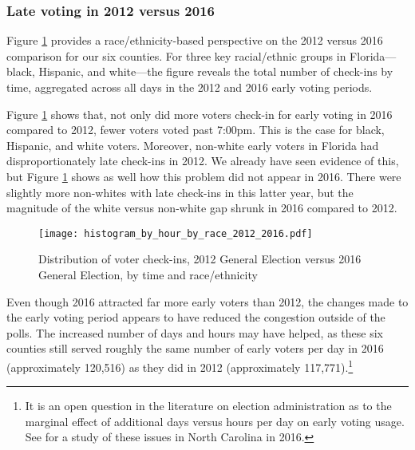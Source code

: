 \documentclass[12pt,titlepage]{article}
\begin{document}
% 

\subsubsection*{Late voting in 2012 versus 2016}

Figure \ref{fig:race2012and2016} provides a race/ethnicity-based
perspective on the 2012 versus 2016 comparison for our six counties.
For three key racial/ethnic groups in Florida---black, Hispanic, and
white---the figure reveals the total number of check-ins by time,
aggregated across all days in the 2012 and 2016 early voting periods.

Figure \ref{fig:race2012and2016} shows that, not only did more voters
check-in for early voting in 2016 compared to 2012, fewer voters voted
past 7:00pm.  This is the case for black, Hispanic, and white
voters. Moreover, non-white early voters in Florida had
disproportionately late check-ins in 2012.  We already have seen
evidence of this, but Figure \ref{fig:race2012and2016} shows as well
how this problem did not appear in 2016.  There were slightly more
non-whites with late check-ins in this latter year, but the magnitude
of the white versus non-white gap shrunk in 2016 compared to 2012.

\begin{figure}[!ht]
  \caption{Distribution of voter check-ins, 2012 General Election
    versus 2016 General Election, by time and race/ethnicity}
  \label{fig:race2012and2016}
  \centering
  \centering\texttt{[image: histogram\_by\_hour\_by\_race\_2012\_2016.pdf]}
\end{figure}

Even though 2016 attracted far more early voters than 2012, the
changes made to the early voting period appears to have reduced the
congestion outside of the polls. The increased number of days and
hours may have helped, as these six counties still served roughly the
same number of early voters per day in 2016 (approximately 120,516) as
they did in 2012 (approximately 117,771).\footnote{It is an open
  question in the literature on election administration as to the
  marginal effect of additional days versus hours per day on early
  voting usage.  See \citet{walkeretal:ncearly} for a study of these
  issues in North Carolina in 2016.}


\end{document}
